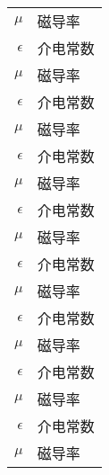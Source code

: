 \begin{nomenclature}
\begin{longtable}{rl}
  $\mu$      & 磁导率  \\
  $\epsilon$ & 介电常数 \\
  $\mu$      & 磁导率  \\
  $\epsilon$ & 介电常数 \\
  $\mu$      & 磁导率  \\
  $\epsilon$ & 介电常数 \\
  $\mu$      & 磁导率  \\
  $\epsilon$ & 介电常数 \\
  $\mu$      & 磁导率  \\
  $\epsilon$ & 介电常数 \\
  $\mu$      & 磁导率  \\
  $\epsilon$ & 介电常数 \\
  $\mu$      & 磁导率  \\
  $\epsilon$ & 介电常数 \\
  $\mu$      & 磁导率  \\
  $\epsilon$ & 介电常数 \\
  $\mu$      & 磁导率  \\
\end{longtable}

\end{nomenclature}
